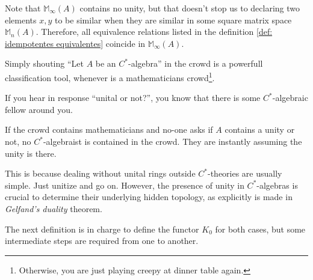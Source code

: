 \begin{observacao}
\label{obs: similar em M_inf}
Note that $\mathbb M_\infty(A)$ contains no unity, but that doesn't stop us to declaring two elements $x,y$ to be similar when they are similar in some square matrix space $\mathbb M_n(A)$. Therefore, all equivalence relations listed in the definition \ref{def: idempotentes equivalentes} coincide in $\mathbb M_\infty(A)$.
\end{observacao}

Simply shouting ``Let $A$ be an $C^*$-algebra'' in the crowd is a powerfull classification tool, whenever is a mathematicians crowd\footnote{Otherwise, you are just playing creepy at dinner table again.}. 
\begin{itroman}
    \item If you hear in response ``unital or not?'', you know that there is some $C^*$-algebraic fellow around you.
    \item If the crowd contains mathematicians and no-one asks if $A$ contains a unity or not, no $C^*$-algebraist is contained in the crowd. They are instantly assuming the unity is there. 
\end{itroman}

This is because dealing without unital rings outside $C^*$-theories are usually simple. Just unitize and go on. However, the presence of unity in $C^*$-algebras is crucial to determine their underlying hidden topology, as explicitly is made in \textit{Gelfand's duality} theorem.

The next definition is in charge to define the functor $K_0$ for both cases, but some intermediate steps are required from one to another.


